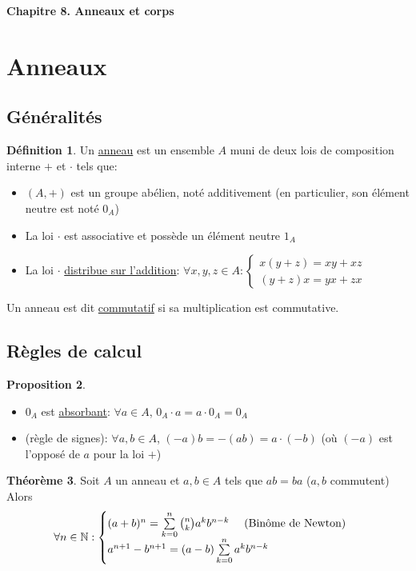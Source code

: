 \documentclass[10pt,a4paper]{article}
\theoremstyle{definition}
\newtheorem{proposition}{Proposition}[section]
\newtheorem{theorem}[proposition]{Théorème}
\newtheorem{definition}[proposition]{Définition}
\begin{document}
\renewcommand{\labelitemi}{$*$}
\renewcommand{\labelenumi}{(\roman{enumi})}
\begin{center}
{\Large \textbf{Chapitre 8. Anneaux et corps}}
\end{center}

\section{Anneaux}
\subsection{Généralités}
\begin{definition}
Un \uline{anneau} est un ensemble $A$ muni de deux lois de composition interne $+$ et $\cdot$ tels que:
\begin{itemize}
\item $(A, +)$ est un groupe abélien, noté additivement (en particulier, son élément neutre est noté $0_A$)
\item La loi $\cdot$ est associative et possède un élément neutre $1_A$
\item La loi $\cdot$ \uline{distribue sur l'addition}: $\forall x, y, z \in A: \begin{cases}
x(y + z) = xy + xz \\
(y + z)x = yx + zx
\end{cases}$
\end{itemize}
Un anneau est dit \uline{commutatif} si sa multiplication est commutative.
\end{definition}

\subsection{Règles de calcul}
\begin{proposition}
\hfill
\begin{itemize}
\item $0_A$ est \uline{absorbant}: $\forall a \in A$, $0_A \cdot a = a \cdot 0_A = 0_A$
\item (règle de signes): $\forall a, b \in A$, $(-a)b = -(ab) = a \cdot (-b)$ \quad (où $(-a)$ est l'opposé de $a$ pour la loi $+$)
\end{itemize}
\end{proposition}
\begin{theorem}
Soit $A$ un anneau et $a, b \in A$ tels que $ab = ba$ ($a, b$ commutent) \\
Alors
\[\forall n \in \mathbb{N}: \begin{cases}
(a + b)^n = \sum\limits_{k = 0}^n \binom{n}{k} a^k b^{n - k} \text{ \quad (Binôme de Newton) } \\
a^{n + 1} - b^{n + 1} = (a - b) \sum\limits_{k = 0}^n a^k b^{n - k}
\end{cases}\]
\end{theorem}
\end{document}
